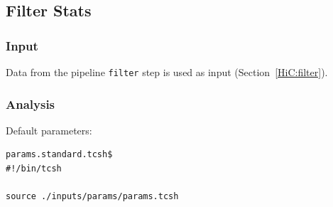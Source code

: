 \subsection{Filter Stats}\label{HiC:filter-stats} %
\subsubsection{Input} %
Data from the pipeline \texttt{filter} step is used as input (Section~\ref{HiC:filter}).
\subsubsection{Analysis} %
Default parameters:
\begin{lstlisting}
params.standard.tcsh$
#!/bin/tcsh

source ./inputs/params/params.tcsh
\end{lstlisting}

